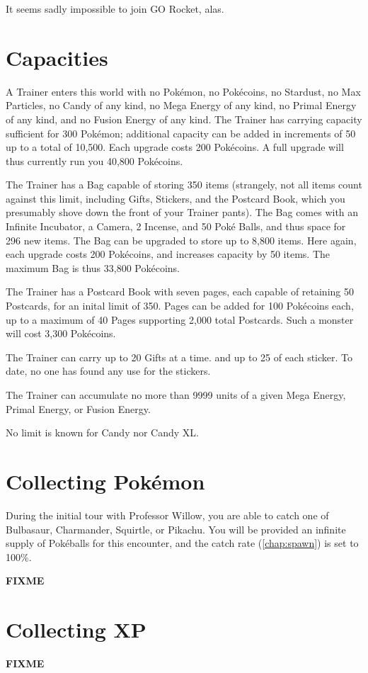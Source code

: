 It seems sadly impossible to join GO Rocket, alas.

\section{Capacities}
A Trainer enters this world with no Pokémon, no Pokécoins, no Stardust,
  no Max Particles, no Candy of any kind, no Mega Energy of any kind,
  no Primal Energy of any kind, and no Fusion Energy of any kind.
The Trainer has carrying capacity sufficient for 300 Pokémon; additional
  capacity can be added in increments of 50 up to a total of 10,500.
Each upgrade costs 200 Pokécoins.
A full upgrade will thus currently run you 40,800 Pokécoins.

The Trainer has a Bag capable of storing 350 items (strangely, not all items
  count against this limit, including Gifts, Stickers, and the Postcard Book,
  which you presumably shove down the front of your Trainer pants).
The Bag comes with an Infinite Incubator, a Camera, 2 Incense, and 50 Poké Balls,
  and thus space for 296 new items.
The Bag can be upgraded to store up to 8,800 items.
Here again, each upgrade costs 200 Pokécoins, and increases capacity by 50 items.
The maximum Bag is thus 33,800 Pokécoins.

The Trainer has a Postcard Book with seven pages, each capable of retaining
 50 Postcards, for an inital limit of 350.
Pages can be added for 100 Pokécoins each, up to a maximum of 40 Pages
 supporting 2,000 total Postcards.
Such a monster will cost 3,300 Pokécoins.

The Trainer can carry up to 20 Gifts at a time. and up to 25 of each sticker.
To date, no one has found any use for the stickers.

The Trainer can accumulate no more than 9999 units of a given Mega Energy,
 Primal Energy, or Fusion Energy.

No limit is known for Candy nor Candy XL.

\section{Collecting Pokémon}
During the initial tour with Professor Willow, you are able to catch one of
 Bulbasaur, Charmander, Squirtle, or Pikachu.
You will be provided an infinite supply of Pokéballs for this encounter, and
 the catch rate (\autoref{chap:spawn}) is set to 100\%.

\textbf{FIXME}

\section{Collecting XP}
\textbf{FIXME}


